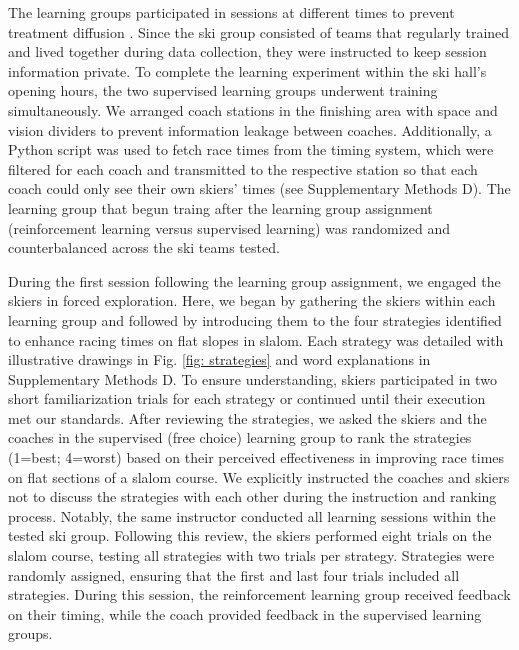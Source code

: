 The learning groups participated in sessions at different times to prevent treatment
diffusion \cite{maxwell_designing_2017}. Since the ski group consisted of teams that regularly trained and lived together during data collection, they were instructed to keep session information private. To complete the learning experiment within the ski hall's opening hours, the two supervised learning groups underwent training simultaneously. We arranged coach stations in the finishing area with space and vision dividers to prevent information leakage between coaches. Additionally, a Python script was used to fetch race times from the timing system, which were filtered for each coach and transmitted to the respective station so that each coach could only see their own skiers' times (see Supplementary Methods D). The learning group that begun traing after the learning group assignment (reinforcement learning versus supervised learning) was randomized and counterbalanced across the ski teams tested. 

During the first session following the learning group assignment, we engaged the skiers in forced exploration. Here, we began by gathering the skiers within each learning group and followed by introducing them to the four strategies identified to enhance racing times on flat slopes in slalom. Each strategy was detailed with illustrative drawings in Fig. \ref{fig: strategies} and word explanations in Supplementary Methods D. To ensure understanding, skiers participated in two short familiarization trials for each strategy or continued until their execution met our standards. After reviewing the strategies, we asked the skiers and the coaches in the supervised (free choice) learning group to rank the strategies (1=best; 4=worst) based on their perceived effectiveness in improving race times on flat sections of a slalom course. We explicitly instructed the coaches and skiers not to discuss the strategies with each other during the instruction and ranking process. Notably, the same instructor conducted all learning sessions within the tested ski group. Following this review, the skiers performed eight trials on the slalom course, testing all strategies with two trials per strategy. Strategies were randomly assigned, ensuring that the first and last four trials included all strategies. During this session, the reinforcement learning group received feedback on their timing, while the coach provided feedback in the supervised learning groups.

